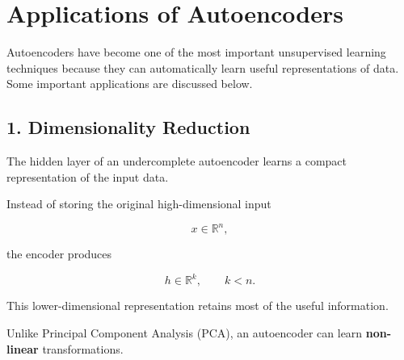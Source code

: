 \documentclass{article}
\begin{document}
	\section{Applications of Autoencoders}
	
	Autoencoders have become one of the most important unsupervised learning
	techniques because they can automatically learn useful representations of data.
	Some important applications are discussed below.
	
	\subsection{1. Dimensionality Reduction}
	
	The hidden layer of an undercomplete autoencoder learns a compact
	representation of the input data.
	
	Instead of storing the original high-dimensional input
	
	\[
	x\in\mathbb{R}^{n},
	\]
	
	the encoder produces
	
	\[
	h\in\mathbb{R}^{k},
	\qquad k<n.
	\]
	
	This lower-dimensional representation retains most of the useful information.
	
	Unlike Principal Component Analysis (PCA), an autoencoder can learn
	\textbf{non-linear} transformations.
	
%			
%			
%			
%			
%			
%	
\end{document}
